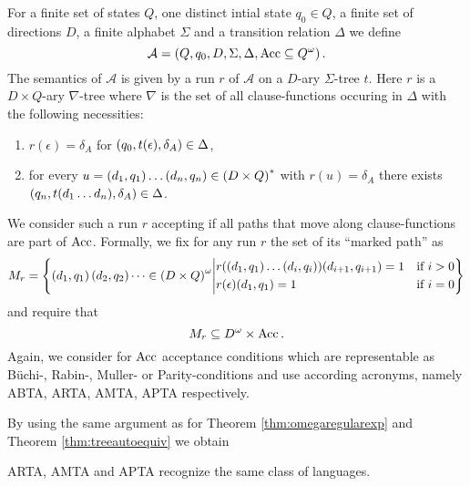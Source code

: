 \begin{definition}
  For a finite set of states $Q$, one distinct intial state $q_{0}\in Q$, a
  finite set of directions $D$, a finite alphabet $\Sigma$ and a transition
  relation $\Delta$ we define 
  \begin{equation*}
    \mathcal{A} = \left(Q, q_{0}, D, \Sigma, \Delta, \operatorname{Acc}\subseteq Q^{\omega}\right).
  \end{equation*}
  The semantics of $\mathcal{A}$ is given by a run $r$ of $\mathcal{A}$ on a
  $D$-ary $\Sigma$-tree $t$. Here $r$ is a $D\times Q$-ary $\nabla$-tree where 
  $\nabla$ is the set of all clause-functions occuring in $\Delta$ with the 
  following necessities:
  \begin{enumerate}
    \item $r(\epsilon) = \delta_{A}$ for 
      $\left(q_{0}, t(\epsilon), \delta_{A}\right)\in\Delta$,
    \item for every $u = \left(d_{1}, q_{1}\right)\dots\left(d_{n}, q_{n}\right)\in
      \left(D\times Q\right)^{*}$ with $r(u) = \delta_{A}$ there exists
      $\left(q_{n}, t(d_{1}\dots d_{n}), \delta_{A}\right)\in\Delta$.
  \end{enumerate}
  We consider such a run $r$ accepting if all paths that move along 
  clause-functions are part of $\operatorname{Acc}$. Formally, we fix for any run $r$ the set 
  of its \enquote{marked path} as
  \begin{equation*}
  M_{r} = \left\{
    \left(d_{1}, q_{1}\right)\left(d_{2}, q_{2}\right)\dots\in
    \left(D\times Q\right)^{\omega}\middle|
    \begin{aligned}
      &r(\left(d_{1}, q_{1}\right)\dots
      \left(d_{i}, q_{i}\right))(d_{i+1}, q_{i+1}) = 1&\text{if }i>0\\
      &r(\epsilon)(d_{1}, q_{1}) = 1&\text{if }i=0
    \end{aligned}
    \right\}
  \end{equation*}
  and require that
  \begin{equation*}
    M_{r}\subseteq D^{\omega}\times\operatorname{Acc}.
  \end{equation*}
  Again, we consider for $\operatorname{Acc}$ acceptance conditions which are representable
  as Büchi-, Rabin-, Muller- or Parity-conditions and use according acronyms,
  namely \acs{ABTA}, \acs{ARTA}, \acs{AMTA}, \acs{APTA} respectively.
      
\end{definition}
By using the same argument as for Theorem 
\ref{thm:omegaregularexp} and Theorem \ref{thm:treeautoequiv} we obtain
\begin{theorem}
  \ac{ARTA}, \ac{AMTA} and \ac{APTA} recognize the same class of languages.
  \label{thm:atreeautoequiv}
\end{theorem}
